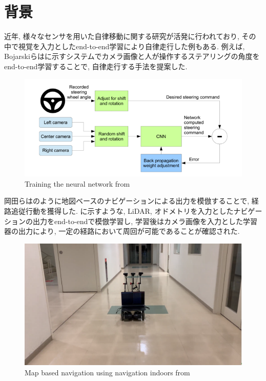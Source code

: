 
\section{背景}
近年, 様々なセンサを用いた自律移動に関する研究が活発に行われており, その中で視覚を入力としたend-to-end学習により自律走行した例もある. 例えば, Bojarskiらはに示すシステムでカメラ画像と人が操作するステアリングの角度をend-to-end学習することで, 自律走行する手法を提案した\cite{bojaski}.

\vspace{20mm}

\begin{figure}[hbtp]
\centering
\includegraphics[keepaspectratio, scale=0.5]
{images/bojaski.png}
\caption{Training the neural network from \cite{bojaski}}
\label{Fig:bojaski}
\end{figure}

\newpage
岡田らはのように地図ベースのナビゲーションによる出力を模倣することで, 経路追従行動を獲得した\cite{okada-si2020}. に示すような, LiDAR, オドメトリを入力としたナビゲーションの出力をend-to-endで模倣学習し, 学習後はカメラ画像を入力とした学習器の出力により, 一定の経路において周回が可能であることが確認された. 

\vspace{20mm}

\begin{figure}[h]
     \centering
     \includegraphics[keepaspectratio, scale=0.15]
     {images/tsudanuma2-3.png}
     \caption{Map based navigation using navigation indoors from \cite{okada-si2020}}
     \label{Fig:tsudanuma2-3}
     \end{figure}

